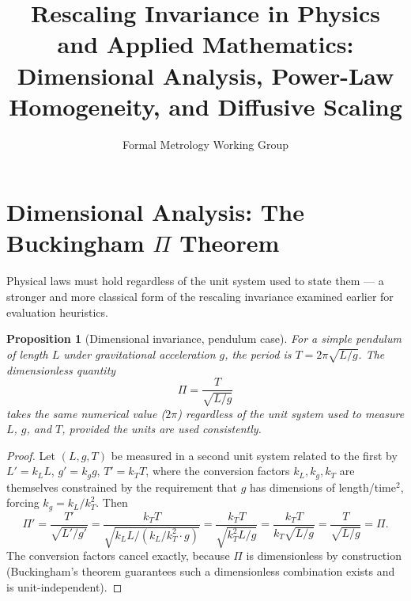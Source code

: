 \documentclass[10pt,journal,compsoc]{IEEEtran}
\newtheorem{proposition}{Proposition}
\begin{document}
\title{Rescaling Invariance in Physics and Applied Mathematics:\\ Dimensional Analysis, Power-Law Homogeneity, and Diffusive Scaling}
\author{Formal Metrology Working Group}


\maketitle

\section{Dimensional Analysis: The Buckingham $\Pi$ Theorem}
Physical laws must hold regardless of the unit system used to state them — a stronger and more classical form of the rescaling invariance examined earlier for evaluation heuristics.

\begin{proposition}[Dimensional invariance, pendulum case]
For a simple pendulum of length $L$ under gravitational acceleration $g$, the period is $T = 2\pi\sqrt{L/g}$. The dimensionless quantity
\begin{equation}
    \Pi = \frac{T}{\sqrt{L/g}}
\end{equation}
takes the same numerical value ($2\pi$) regardless of the unit system used to measure $L$, $g$, and $T$, provided the units are used consistently.
\end{proposition}
\begin{proof}
Let $(L,g,T)$ be measured in a second unit system related to the first by $L' = k_L L$, $g' = k_g g$, $T'=k_T T$, where the conversion factors $k_L,k_g,k_T$ are themselves constrained by the requirement that $g$ has dimensions of length/time$^2$, forcing $k_g = k_L/k_T^2$. Then
\begin{equation}
    \Pi' = \frac{T'}{\sqrt{L'/g'}} = \frac{k_T T}{\sqrt{k_L L / (k_L/k_T^2 \cdot g)}} = \frac{k_T T}{\sqrt{k_T^2 L/g}} = \frac{k_T T}{k_T\sqrt{L/g}} = \frac{T}{\sqrt{L/g}} = \Pi.
\end{equation}
The conversion factors cancel exactly, because $\Pi$ is dimensionless by construction (Buckingham's theorem guarantees such a dimensionless combination exists and is unit-independent).
\end{proof}
\end{document}

